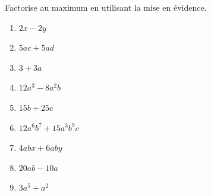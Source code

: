 %
%
	Factorise au maximum en utilisant la mise en évidence.
	\begin{enumerate}[cols=3]
		\item \(2x - 2y\)
		\item \(5ac + 5ad \)
		\item \(3 + 3a \)
		\item \(12a^3 - 8a^2b \)
		\item \(15b + 25c\)
		\item \(12 a^6b^7+ 15 a^3b^9c\)
		\item \(4 abx + 6 aby\)
		\item \(20 ab - 10a\)
		\item \(3a^5 + a^2\)
	\end{enumerate}
